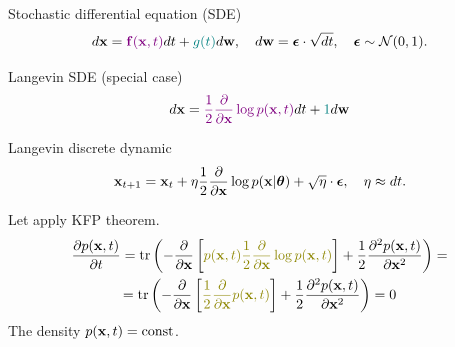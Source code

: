 \begin{frame}{Stochastic differential equation (SDE)}
	\[
		d\mathbf{x} = {\color{violet}\mathbf{f}(\mathbf{x}, t)} dt + {\color{teal}g(t)} d \mathbf{w}, \quad d \mathbf{w} = \boldsymbol{\epsilon} \cdot \sqrt{dt}, \quad \boldsymbol{\epsilon} \sim \mathcal{N}(0, 1).
	\]
	\vspace{-0.4cm}
	\begin{block}{Langevin SDE (special case)}
		\vspace{-0.3cm}
		\[
			d \mathbf{x} = {\color{violet}\frac{1}{2} \frac{\partial}{\partial \mathbf{x}} \log p(\mathbf{x}, t)} d t + {\color{teal} 1 }d \mathbf{w}
		\]
		\vspace{-0.6cm}
	\end{block}
	\begin{block}{Langevin discrete dynamic}
		\vspace{-0.3cm}
		\[
			\mathbf{x}_{t + 1} = \mathbf{x}_t + \eta \frac{1}{2} \frac{\partial}{\partial \mathbf{x}} \log p(\mathbf{x} | \boldsymbol{\theta}) + \sqrt{\eta} \cdot \boldsymbol{\epsilon}, \quad \eta \approx dt.
		\]
		\vspace{-0.3cm}
	\end{block}
	Let apply KFP theorem.
	\begin{multline*}
		\frac{\partial p(\bx, t)}{\partial t} =  \text{tr} \left(- \frac{\partial}{\partial \bx}\left[ {\color{olive}p(\bx, t) \frac{1}{2} \frac{\partial}{\partial \bx} \log p(\bx, t)} \right]  + \frac{1}{2} \frac{\partial^2 p(\bx, t)}{\partial \bx^2} \right) = \\
		= \text{tr} \left(- \frac{\partial}{\partial \bx}\left[ {\color{olive}\frac{1}{2} \frac{\partial}{\partial \bx} p(\bx, t) } \right]  + \frac{1}{2} \frac{\partial^2 p(\bx, t)}{\partial \bx^2} \right) = 0
	\end{multline*}
	The density $p(\mathbf{x}, t) = \text{const}$.
\end{frame}
